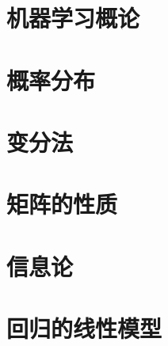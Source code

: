 \chapter{机器学习概论}
%

%
%


\chapter{概率分布}






\chapter{变分法}

\chapter{矩阵的性质}

\chapter{信息论}

\chapter{回归的线性模型}







